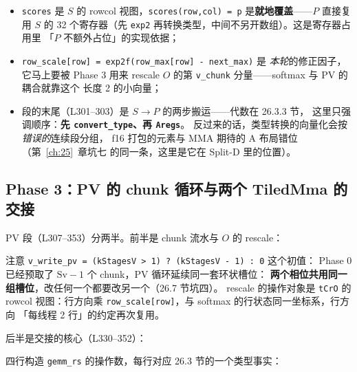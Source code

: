 \begin{itemize}[itemsep=2pt,topsep=2pt]
  \item \texttt{scores} 是 \(S\) 的 rowcol 视图，\texttt{scores\allowbreak{}(row,\allowbreak{}col) =\allowbreak{} p}
        是\textbf{就地覆盖}——$P$ 直接复用 $S$ 的 32 个寄存器（先
        \texttt{exp2} 再转换类型，中间不另开数组）。这是寄存器占用里
        「$P$ 不额外占位」的实现依据；
  \item \texttt{row\_\allowbreak{}scale[row] =\allowbreak{} exp2f\allowbreak{}(row\_\allowbreak{}max[row] - next\_\allowbreak{}max)} 是
        \emph{本轮}的修正因子，它马上要被 Phase 3 用来 rescale
        $O$ 的第 \texttt{v\_chunk} 分量——softmax 与 PV 的耦合就靠这个
        长度 2 的小向量；
  \item 段的末尾（L301--303）是 $S \to P$ 的两步搬运——代数在 26.3.3 节，
    这里只强调顺序：\textbf{先 \texttt{convert\_\allowbreak{}type}、再 \texttt{Aregs}}。
        反过来的话，类型转换的向量化会按\emph{错误的}连续段分组，
        f16 打包的元素与 MMA 期待的 A 布局错位（第~\ref{ch:25}~章坑七
        的同一条，这里是它在 Split-D 里的位置）。
\end{itemize}

\subsection{Phase 3：PV 的 chunk 循环与两个 TiledMma 的交接}

PV 段（L307--353）分两半。前半是 chunk 流水与 $O$ 的 rescale：



注意 \texttt{v\_write\_pv = (kStagesV > 1) ? (kStagesV - 1) : 0} 这个初值：
Phase 0 已经预取了 $\mathrm{Sv}-1$ 个 chunk，PV 循环延续同一套环状槽位：
\textbf{两个相位共用同一组槽位}，改任何一个都要改另一个（26.7 节坑四）。
rescale 的操作对象是 \texttt{tCrO} 的 rowcol 视图：行方向乘
\texttt{row\_\allowbreak{}scale[row]}，与 softmax 的行状态同一坐标系，行方向
「每线程 2 行」的约定再次复用。

后半是交接的核心（L330--352）：



四行构造 \texttt{gemm\_rs} 的操作数，每行对应 26.3 节的一个类型事实：

